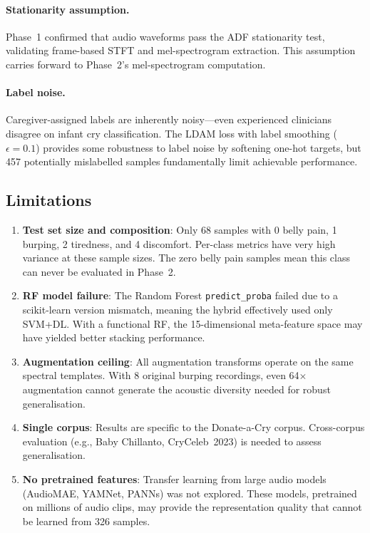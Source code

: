 \documentclass[11pt,a4paper]{article}
\begin{document}
\paragraph{Stationarity assumption.}
Phase~1 confirmed that audio waveforms pass the ADF stationarity test,
validating frame-based STFT and mel-spectrogram extraction. This
assumption carries forward to Phase~2's mel-spectrogram computation.

\paragraph{Label noise.}
Caregiver-assigned labels are inherently noisy---even experienced
clinicians disagree on infant cry classification. The LDAM loss with
label smoothing ($\epsilon = 0.1$) provides some robustness to label
noise by softening one-hot targets, but 457 potentially mislabelled
samples fundamentally limit achievable performance.

\subsection{Limitations}

\begin{enumerate}[nosep]
  \item \textbf{Test set size and composition}: Only 68 samples with
        0 belly pain, 1 burping, 2 tiredness, and 4 discomfort.
        Per-class metrics have very high variance at these sample sizes.
        The zero belly pain samples mean this class can never be
        evaluated in Phase~2.
  \item \textbf{RF model failure}: The Random Forest
        \texttt{predict\_proba} failed due to a scikit-learn version
        mismatch, meaning the hybrid effectively used only SVM+DL.
        With a functional RF, the 15-dimensional meta-feature space
        may have yielded better stacking performance.
  \item \textbf{Augmentation ceiling}: All augmentation transforms
        operate on the same spectral templates. With 8 original burping
        recordings, even 64$\times$ augmentation cannot generate the
        acoustic diversity needed for robust generalisation.
  \item \textbf{Single corpus}: Results are specific to the
        Donate-a-Cry corpus. Cross-corpus evaluation (e.g., Baby
        Chillanto, CryCeleb~2023) is needed to assess generalisation.
  \item \textbf{No pretrained features}: Transfer learning from large
        audio models (AudioMAE, YAMNet, PANNs) was not explored. These
        models, pretrained on millions of audio clips, may provide the
        representation quality that cannot be learned from 326 samples.
\end{enumerate}
\end{document}

